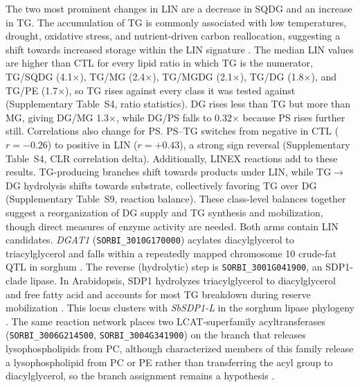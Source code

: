 \documentclass[9pt,twocolumn,twoside]{rilabRxiv}
\begin{document}
The two most prominent changes in LIN are a decrease in SQDG and an increase in TG. The accumulation of TG is commonly associated with low temperatures, drought, oxidative stress, and nutrient-driven carbon reallocation, suggesting a shift towards increased storage within the LIN signature \citep{Tan2018, Yan2025, Pfaff2020}. The median LIN values are higher than CTL for every lipid ratio in which TG is the numerator, TG/SQDG (4.1$\times$), TG/MG (2.4$\times$), TG/MGDG (2.1$\times$), TG/DG (1.8$\times$), and TG/PE (1.7$\times$), so TG rises against every class it was tested against (Supplementary Table~S4, ratio statistics). DG rises less than TG but more than MG, giving DG/MG 1.3$\times$, while DG/PS falls to 0.32$\times$ because PS rises further still. Correlations also change for PS. PS--TG switches from negative in CTL ($r=-0.26$) to positive in LIN ($r=+0.43$), a strong sign reversal (Supplementary Table~S4, CLR correlation delta). Additionally, LINEX reactions add to these results. TG-producing branches shift towards products under LIN, while TG$\rightarrow$DG hydrolysis shifts towards substrate, collectively favoring TG over DG (Supplementary Table~S9, reaction balance). These class-level balances together suggest a reorganization of DG supply and TG synthesis and mobilization, though direct measures of enzyme activity are needed. Both arms contain LIN candidates. \textit{DGAT1} (\texttt{SORBI\_3010G170000}) acylates diacylglycerol to triacylglycerol and falls within a repeatedly mapped chromosome 10 crude-fat QTL in sorghum \citep{Boyles2017DGAT1, Yen2008DGAT}. The reverse (hydrolytic) step is \texttt{SORBI\_3001G041900}, an SDP1-clade lipase. In Arabidopsis, SDP1 hydrolyzes triacylglycerol to diacylglycerol and free fatty acid and accounts for most TG breakdown during reserve mobilization \citep{Kelly2011SDP1L}. This locus clusters with \textit{SbSDP1-L} in the sorghum lipase phylogeny \citep{Sapara2024PLA}. The same reaction network places two LCAT-superfamily acyltransferases (\texttt{SORBI\_3006G214500}, \texttt{SORBI\_3004G341900}) on the branch that releases lysophospholipids from PC, although characterized members of this family release a lysophospholipid from PC or PE rather than transferring the acyl group to diacylglycerol, so the branch assignment remains a hypothesis \citep{Chen2012LCATPLA, Banas2005PSAT}.
\end{document}
